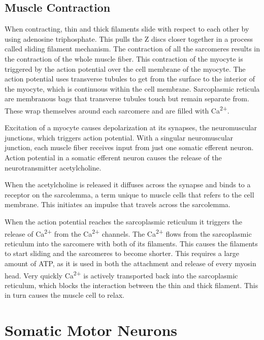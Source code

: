 \hypertarget{muscle-contraction}{%
\subsection{Muscle Contraction}\label{muscle-contraction}}

When contracting, thin and thick filaments slide with respect to each other by using adenosine triphosphate. This pulls the Z discs closer together in a process called sliding filament mechanism. The contraction of all the sarcomeres results in the contraction of the whole muscle fiber. This contraction of the myocyte is triggered by the action potential over the cell membrane of the myocyte. The action potential uses transverse tubules to get from the surface to the interior of the myocyte, which is continuous within the cell membrane. Sarcoplasmic reticula are membranous bags that transverse tubules touch but remain separate from. These wrap themselves around each sarcomere and are filled with Ca\textsuperscript{2+}.

Excitation of a myocyte causes depolarization at its synapses, the neuromuscular junctions, which triggers action potential. With a singular neuromuscular junction, each muscle fiber receives input from just one somatic efferent neuron. Action potential in a somatic efferent neuron causes the release of the neurotransmitter acetylcholine.

When the acetylcholine is released it diffuses across the synapse and binds to a receptor on the sarcolemma, a term unique to muscle cells that refers to the cell membrane. This initiates an impulse that travels across the sarcolemma.

When the action potential reaches the sarcoplasmic reticulum it triggers the release of Ca\textsuperscript{2+} from the Ca\textsuperscript{2+} channels. The Ca\textsuperscript{2+} flows from the sarcoplasmic reticulum into the sarcomere with both of its filaments. This causes the filaments to start sliding and the sarcomeres to become shorter. This requires a large amount of ATP, as it is used in both the attachment and release of every myosin head. Very quickly Ca\textsuperscript{2+} is actively transported back into the sarcoplasmic reticulum, which blocks the interaction between the thin and thick filament. This in turn causes the muscle cell to relax.

\hypertarget{somatic-motor-neurons}{%
\section{Somatic Motor Neurons}\label{somatic-motor-neurons}}


